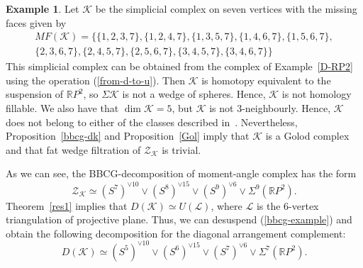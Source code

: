 \documentclass[a4paper,12pt]{amsart}
\newcommand{\K}{\mathcal K}
\newcommand{\RR}{\mathbb R}
\newcommand{\Z}{\mathcal Z}
\theoremstyle{definition}
\newtheorem{example}[formula]{Example}
\theoremstyle{remark}
\numberwithin{equation}{section}
\begin{document}
\begin{example}
Let  $\K$ be the simplicial complex on seven vertices with the missing faces given by
	\begin{eqnarray*}
		MF(\K) = \{ \{1, 2, 3, 7\}, \{1, 2, 4, 7\}, \{1, 3, 5, 7\}, \{1, 4, 6, 7\}, \{1, 5, 6, 7 \},\\
		\{2, 3, 6, 7 \}, \{2, 4, 5, 7\}, \{2, 5, 6, 7\}, \{3, 4, 5, 7\}, \{3, 4, 6, 7\} \}
	\end{eqnarray*}
	This simplicial complex can be obtained from the complex of Example~\ref{D-RP2} using the operation (\ref{from-d-to-u}).
    Then $\K$ is homotopy equivalent to the suspension of $\RR P^2$,
    so $\Sigma \K$ is not a wedge of spheres. 
    Hence, $\K$ is not homology fillable. We also have that $\dim \K = 5$, but $\K$ is not 3-neighbourly. Hence, $\K$ does not belong to either of the classes described in~\cite{IK}.
	Nevertheless, Proposition~\ref{bbcg-dk} and Proposition~\ref{Gol} imply that $\K$ is a Golod complex and that fat wedge filtration of $\Z_\K$ is trivial.
	
	As we can see, the BBCG-decomposition of moment-angle complex has the form
	\begin{equation}\label{bbcg-example}
		\Z_\K \simeq (S^7)^{\vee 10} \vee (S^8)^{\vee 15} \vee (S^9)^{\vee 6} \vee \Sigma^9(\RR P^2).
	\end{equation}
	Theorem~\ref{res1} implies that $D(\K) \simeq U(\mathcal{L})$, where $\mathcal{L}$ is the 6-vertex triangulation of projective plane.
	Thus, we can desuspend (\ref{bbcg-example}) and obtain the following decomposition for the diagonal arrangement complement:
	$$D(\K) \simeq (S^5)^{\vee 10} \vee (S^6)^{\vee 15} \vee (S^7)^{\vee 6} \vee \Sigma^7(\RR P^2).$$
\end{example}



\end{document}

